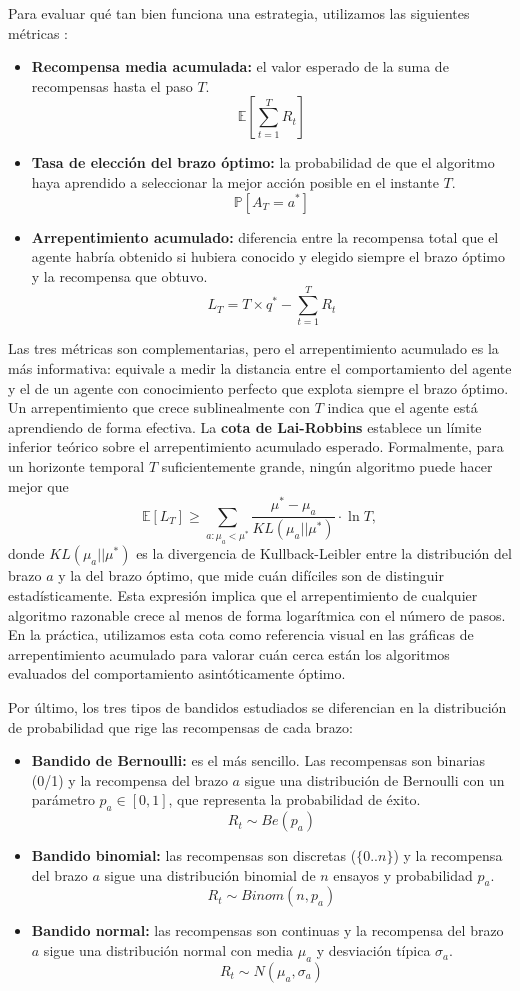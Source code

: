 Para evaluar qué tan bien funciona una estrategia, utilizamos las siguientes métricas \cite{sutton2018}:

\begin{itemize}
    \item \textbf{Recompensa media acumulada:} el valor esperado de la suma de recompensas hasta el paso $T$. 
    $$\mathbb{E}\left[\sum^T_{t=1}R_t \right]$$
    \item \textbf{Tasa de elección del brazo óptimo:} la probabilidad de que el algoritmo haya aprendido a seleccionar la mejor acción posible en el instante $T$.
    $$\mathbb{P}\left[A_T=a^* \right]$$
    \item \textbf{Arrepentimiento acumulado:} diferencia entre la recompensa total que el agente habría obtenido si hubiera conocido y elegido siempre el brazo óptimo y la recompensa que obtuvo.
    $$L_T=T\times q^*-\sum^T_{t=1}R_t$$
\end{itemize}

Las tres métricas son complementarias, pero el arrepentimiento acumulado es la más informativa: equivale a medir la distancia entre el comportamiento del agente y el de un agente con conocimiento perfecto que explota siempre el brazo óptimo. Un arrepentimiento que crece sublinealmente con $T$ indica que el agente está aprendiendo de forma efectiva. La \textbf{cota de Lai-Robbins} \cite{lai1985} establece un límite inferior teórico sobre el arrepentimiento acumulado esperado. Formalmente, para un horizonte temporal $T$ suficientemente grande, ningún algoritmo puede hacer mejor que 
$$\mathbb{E}[L_T]\geq \sum_{a: \mu_a < \mu^*}\frac{\mu^*-\mu_a}{KL(\mu_a||\mu^*)}\cdot \ln T,$$
donde $KL(\mu_a||\mu^*)$ es la divergencia de Kullback-Leibler entre la distribución del brazo $a$ y la del brazo óptimo, que mide cuán difíciles son de distinguir estadísticamente. Esta expresión implica que el arrepentimiento de cualquier algoritmo razonable crece al menos de forma logarítmica con el número de pasos. En la práctica, utilizamos esta cota como referencia visual en las gráficas de arrepentimiento acumulado para valorar cuán cerca están los algoritmos evaluados del comportamiento asintóticamente óptimo. 

Por último, los tres tipos de bandidos estudiados se diferencian en la distribución de probabilidad que rige las recompensas de cada brazo:

\begin{itemize}
    \item \textbf{Bandido de Bernoulli:} es el más sencillo. Las recompensas son binarias (0/1) y la recompensa del brazo $a$ sigue una distribución de Bernoulli con un parámetro $p_a \in [0,1]$, que representa la probabilidad de éxito.
    $$R_t\sim Be(p_a)$$
    \item \textbf{Bandido binomial:} las recompensas son discretas ($\{0..n\}$) y la recompensa del brazo $a$ sigue una distribución binomial de $n$ ensayos y probabilidad $p_a$.
    $$R_t \sim Binom(n,p_a)$$
    \item \textbf{Bandido normal:} las recompensas son continuas y la recompensa del brazo $a$ sigue una distribución normal con media $\mu_a$ y desviación típica $\sigma_a$. 
    $$R_t \sim N(\mu_a, \sigma_a)$$
\end{itemize}

